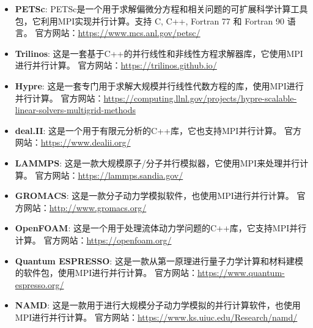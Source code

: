 \documentclass{ctexart}
\begin{document}
\begin{itemize}  
    \item \textbf{PETSc}: PETSc是一个用于求解偏微分方程和相关问题的可扩展科学计算工具包，它利用MPI实现并行计算。支持 C, C++, Fortran 77 和 Fortran 90 语言。
    官方网站：\href{https://www.mcs.anl.gov/petsc/}{https://www.mcs.anl.gov/petsc/}  
      
    \item \textbf{Trilinos}: 这是一套基于C++的并行线性和非线性方程求解器库，它使用MPI进行并行计算。
    官方网站：\href{https://trilinos.github.io/}{https://trilinos.github.io/}  
      
    \item \textbf{Hypre}: 这是一套专门用于求解大规模并行线性代数方程的库，使用MPI进行并行计算。
    官方网站：\href{https://computing.llnl.gov/projects/hypre-scalable-linear-solvers-multigrid-methods}
    {https://computing.llnl.gov/projects/hypre-scalable-linear-solvers-multigrid-methods}  
      
    \item \textbf{deal.II}: 这是一个用于有限元分析的C++库，它也支持MPI并行计算。
    官方网站：\href{https://www.dealii.org/}{https://www.dealii.org/}  
      
    \item \textbf{LAMMPS}: 这是一款大规模原子/分子并行模拟器，它使用MPI来处理并行计算。
    官方网站：\href{https://lammps.sandia.gov/}{https://lammps.sandia.gov/}  
      
    \item \textbf{GROMACS}: 这是一款分子动力学模拟软件，也使用MPI进行并行计算。
    官方网站：\href{http://www.gromacs.org/}{http://www.gromacs.org/}  
      
    \item \textbf{OpenFOAM}: 这是一个用于处理流体动力学问题的C++库，它支持MPI并行计算。
    官方网站：\href{https://openfoam.org/}{https://openfoam.org/}  
      
    \item \textbf{Quantum ESPRESSO}: 这是一款从第一原理进行量子力学计算和材料建模的软件包，使用MPI进行并行计算。
    官方网站：\href{https://www.quantum-espresso.org/}{https://www.quantum-espresso.org/}  
      
    \item \textbf{NAMD}: 这是一款用于进行大规模分子动力学模拟的并行计算软件，也使用MPI进行并行计算。
    官方网站：\href{https://www.ks.uiuc.edu/Research/namd/}{https://www.ks.uiuc.edu/Research/namd/}  
    \end{itemize}  
\end{document}
